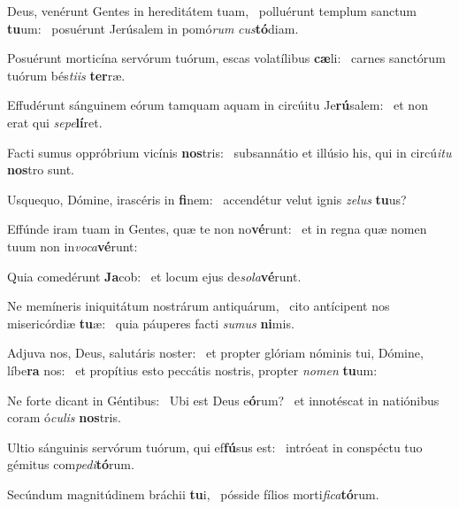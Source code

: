 \item Deus, venérunt Gentes in hereditátem tuam,~\pscross{} polluérunt templum sanctum \textbf{tu}um:~\psstar{} posuérunt Jerúsalem in pomó\textit{rum} \textit{cus}\textbf{tó}diam.

\item Posuérunt morticína servórum tuórum, escas volatílibus \textbf{cæ}li:~\psstar{} carnes sanctórum tuórum bés\textit{tiis} \textbf{ter}ræ.

\item Effudérunt sánguinem eórum tamquam aquam in circúitu Je\textbf{rú}salem:~\psstar{} et non erat qui \textit{sepe}\textbf{lí}ret.

\item Facti sumus oppróbrium vicínis \textbf{nos}tris:~\psstar{} subsannátio et illúsio his, qui in circú\textit{itu} \textbf{nos}tro sunt.

\item Usquequo, Dómine, irascéris in \textbf{fi}nem:~\psstar{} accendétur velut ignis \textit{zelus} \textbf{tu}us?

\item Effúnde iram tuam in Gentes, quæ te non no\textbf{vé}runt:~\psstar{} et in regna quæ nomen tuum non in\textit{voca}\textbf{vé}runt:

\item Quia comedérunt \textbf{Ja}cob:~\psstar{} et locum ejus de\textit{sola}\textbf{vé}runt.

\item Ne memíneris iniquitátum nostrárum antiquárum,~\pscross{} cito antícipent nos misericórdiæ \textbf{tu}æ:~\psstar{} quia páuperes facti \textit{sumus} \textbf{ni}mis.

\item Adjuva nos, Deus, salutáris noster:~\pscross{} et propter glóriam nóminis tui, Dómine, líbe\textbf{ra} nos:~\psstar{} et propítius esto peccátis nostris, propter \textit{nomen} \textbf{tu}um:

\item Ne forte dicant in Géntibus:~\pscross{} Ubi est Deus e\textbf{ó}rum?~\psstar{} et innotéscat in natiónibus coram ó\textit{culis} \textbf{nos}tris.

\item Ultio sánguinis servórum tuórum, qui ef\textbf{fú}sus est:~\psstar{} intróeat in conspéctu tuo gémitus com\textit{pedi}\textbf{tó}rum.

\item Secúndum magnitúdinem bráchii \textbf{tu}i,~\psstar{} pósside fílios morti\textit{fica}\textbf{tó}rum.

